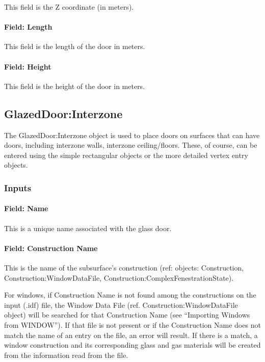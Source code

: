 This field is the Z coordinate (in meters).

\paragraph{Field: Length}\label{field-length-14}

This field is the length of the door in meters.

\paragraph{Field: Height}\label{field-height-8}

This field is the height of the door in meters.

\subsection{GlazedDoor:Interzone}\label{glazeddoorinterzone}

The GlazedDoor:Interzone object is used to place doors on surfaces that can have doors, including interzone walls, interzone ceiling/floors. These, of course, can be entered using the simple rectangular objects or the more detailed vertex entry objects.

\subsubsection{Inputs}\label{inputs-19-007}

\paragraph{Field: Name}\label{field-name-15-010}

This is a unique name associated with the glass door.

\paragraph{Field: Construction Name}\label{field-construction-name-15}

This is the name of the subsurface's construction (ref: objects: Construction, Construction:WindowDataFile, Construction:ComplexFenestrationState).

For windows, if Construction Name is not found among the constructions on the input (.idf) file, the Window Data File (ref. Construction:WindowDataFile object) will be searched for that Construction Name (see ``Importing Windows from WINDOW''). If that file is not present or if the Construction Name does not match the name of an entry on the file, an error will result. If there is a match, a window construction and its corresponding glass and gas materials will be created from the information read from the file.

